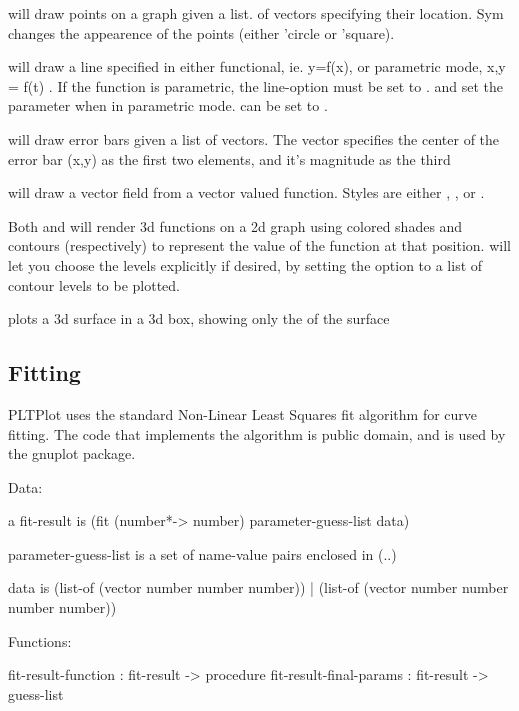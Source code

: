 \documentclass{article}
\begin{document}
{ will draw points on a graph given a list. of vectors specifying their location. Sym changes the appearence of the points (either 'circle or 'square).


 will draw a line specified in either functional, ie. y=f(x), or  parametric mode, x,y = f(t) . If the function is parametric, the line-option  must be set to .  and  set the parameter when in parametric mode.  can be set to .


 will draw error bars given a list of vectors. The vector specifies the  center of the error bar (x,y) as the first two elements, and it's magnitude as the third


 will draw a vector field from a vector valued function. Styles are either , , or . 


Both  and  will render 3d functions on a 2d graph using colored shades and contours (respectively) to represent the value of the function at that position.  will let you choose the levels explicitly if desired, by setting the  option to a list of contour levels to be plotted.

 plots a 3d surface in a 3d box, showing only the  of the surface

\subsection{Fitting}
\label{Fitting}


PLTPlot uses the standard Non-Linear Least Squares fit algorithm for curve fitting. The code that implements the algorithm is public domain, and is used by the gnuplot package.



\begin{schemedisplay}

Data:
       
a fit-result is 
  (fit (number*-> number) parameter-guess-list  data)       
  
  
parameter-guess-list is a set of name-value pairs enclosed in (..)
  
data is
  (list-of (vector number number number))
| (list-of (vector number number number number))
  
Functions:
  
  fit-result-function : fit-result -> procedure
  fit-result-final-params : fit-result -> guess-list
      

\end{schemedisplay}}
\end{document}
